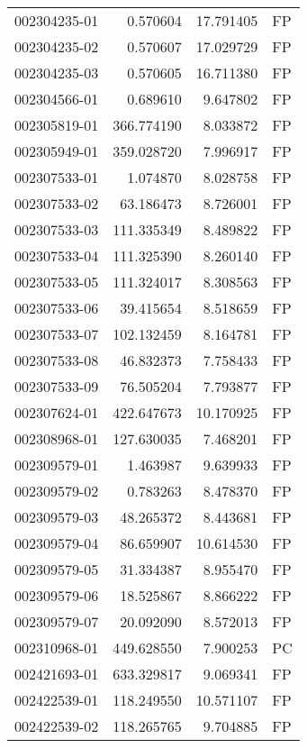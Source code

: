 \begin{tabular}{lrrl}
002304235-01 &    0.570604 &      17.791405 &   FP \\
002304235-02 &    0.570607 &      17.029729 &   FP \\
002304235-03 &    0.570605 &      16.711380 &   FP \\
002304566-01 &    0.689610 &       9.647802 &   FP \\
002305819-01 &  366.774190 &       8.033872 &   FP \\
002305949-01 &  359.028720 &       7.996917 &   FP \\
002307533-01 &    1.074870 &       8.028758 &   FP \\
002307533-02 &   63.186473 &       8.726001 &   FP \\
002307533-03 &  111.335349 &       8.489822 &   FP \\
002307533-04 &  111.325390 &       8.260140 &   FP \\
002307533-05 &  111.324017 &       8.308563 &   FP \\
002307533-06 &   39.415654 &       8.518659 &   FP \\
002307533-07 &  102.132459 &       8.164781 &   FP \\
002307533-08 &   46.832373 &       7.758433 &   FP \\
002307533-09 &   76.505204 &       7.793877 &   FP \\
002307624-01 &  422.647673 &      10.170925 &   FP \\
002308968-01 &  127.630035 &       7.468201 &   FP \\
002309579-01 &    1.463987 &       9.639933 &   FP \\
002309579-02 &    0.783263 &       8.478370 &   FP \\
002309579-03 &   48.265372 &       8.443681 &   FP \\
002309579-04 &   86.659907 &      10.614530 &   FP \\
002309579-05 &   31.334387 &       8.955470 &   FP \\
002309579-06 &   18.525867 &       8.866222 &   FP \\
002309579-07 &   20.092090 &       8.572013 &   FP \\
002310968-01 &  449.628550 &       7.900253 &   PC \\
002421693-01 &  633.329817 &       9.069341 &   FP \\
002422539-01 &  118.249550 &      10.571107 &   FP \\
002422539-02 &  118.265765 &       9.704885 &   FP \\

\end{tabular}
